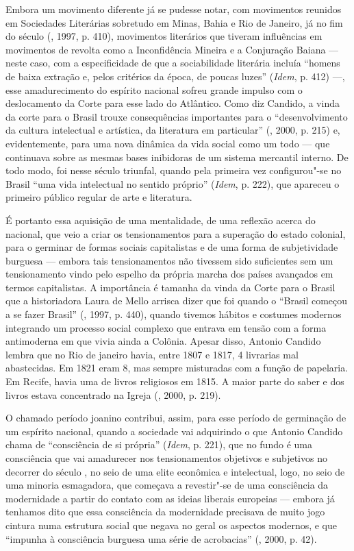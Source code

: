 Embora um movimento diferente já se pudesse notar, com movimentos
reunidos em Sociedades Literárias sobretudo em Minas, Bahia e Rio de
Janeiro, já no fim do século  (, 1997, p. 410), movimentos
literários que tiveram influências em movimentos de revolta como a
Inconfidência Mineira e a Conjuração Baiana --- neste caso, com a
especificidade de que a sociabilidade literária incluía ``homens de
baixa extração e, pelos critérios da época, de poucas luzes''
(\emph{Idem}, p. 412) ---, esse amadurecimento do espírito nacional
sofreu grande impulso com o deslocamento da Corte para esse lado do
Atlântico. Como diz Candido, a vinda da corte para o Brasil trouxe
consequências importantes para o ``desenvolvimento da cultura
intelectual e artística, da literatura em particular'' (, 2000,
p. 215) e, evidentemente, para uma nova dinâmica da vida social como um
todo --- que continuava sobre as mesmas bases inibidoras de um sistema
mercantil interno. De todo modo, foi nesse século triunfal, quando pela
primeira vez configurou"-se no Brasil ``uma vida intelectual no sentido
próprio'' (\emph{Idem}, p. 222), que apareceu o primeiro público regular
de arte e literatura.

É portanto essa aquisição de uma mentalidade, de uma reflexão acerca do
nacional, que veio a criar os tensionamentos para a superação do estado
colonial, para o germinar de formas sociais capitalistas e de uma forma
de subjetividade burguesa --- embora tais tensionamentos não tivessem
sido suficientes sem um tensionamento vindo pelo espelho da própria
marcha dos países avançados em termos capitalistas. A importância é
tamanha da vinda da Corte para o Brasil que a historiadora Laura de
Mello arrisca dizer que foi quando o ``Brasil começou a se fazer
Brasil'' (, 1997, p. 440), quando tivemos hábitos e costumes
modernos integrando um processo social complexo que entrava em tensão
com a forma antimoderna em que vivia ainda a Colônia. Apesar disso, Antonio Candido
lembra que no Rio de janeiro havia, entre 1807 e 1817, 4 livrarias mal
abastecidas. Em 1821 eram 8, mas sempre misturadas com a função de
papelaria. Em Recife, havia uma de livros religiosos em 1815. A maior
parte do saber e dos livros estava concentrado na Igreja (, 2000,
p. 219).

O chamado período joanino contribui, assim, para esse período de
germinação de um espírito nacional, quando a sociedade vai adquirindo o
que Antonio Candido chama de ``consciência de si própria'' (\emph{Idem},
p. 221), que no fundo é uma consciência que vai amadurecer nos
tensionamentos objetivos e subjetivos no decorrer do século , no seio
de uma elite econômica e intelectual, logo, no seio de uma minoria
esmagadora, que começava a revestir"-se de uma consciência da modernidade
a partir do contato com as ideias liberais europeias --- embora já
tenhamos dito que essa consciência da modernidade precisava de muito
jogo cintura numa estrutura social que negava no geral os aspectos
modernos, e que ``impunha à consciência burguesa uma série de
acrobacias'' (, 2000, p. 42).

